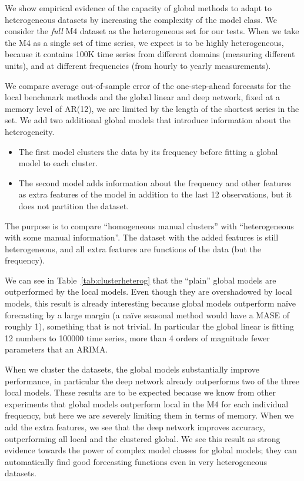 \documentclass[a4paper]{article}
\theoremstyle{custom}
\begin{document}
 We show empirical evidence of the capacity of global methods to adapt to heterogeneous datasets by increasing the complexity of the model class. We consider the \textit{full} M4 dataset as the heterogeneous set for our tests.
 When we take the M4 as a single set of time series, we expect is to be highly heterogeneous, because it contains 100K time series from different domains (measuring different units), and at different frequencies (from hourly to yearly measurements).

We compare average out-of-sample error of the one-step-ahead forecasts for the local benchmark methods and the global linear and deep network, fixed at a memory level of AR(12), we are limited by the length of the shortest series in the set.
We add two additional global models that introduce information about the heterogeneity.
\begin{itemize}
\item The first model clusters the data by its frequency before fitting a global model to each cluster.
\item The second model adds information about the frequency and other features \cite{hyndman2019tsfeatures} as extra features of the model in addition to the last 12 observations, but it does not partition the dataset.
\end{itemize}

The purpose is to compare ``homogeneous manual clusters'' with ``heterogeneous with some manual information''. The dataset with the added features is still heterogeneous, and all extra features are functions of the data (but the frequency).

We can see in Table~\ref{tab:clusterheterog} that the ``plain'' global models are outperformed by the local models. Even though they are overshadowed by local models, this result is already interesting because global models outperform naïve forecasting by a large margin (a naïve seasonal method would have a MASE of roughly 1), something that is not trivial. In particular the global linear is fitting 12 numbers to 100000 time series, more than 4 orders of magnitude fewer parameters that an ARIMA.

When we cluster the datasets, the global models substantially improve performance, in particular the deep network already outperforms two of the three local models. These results are to be expected because we know from other experiments that global models outperform local in the M4 for each individual frequency, but here we are severely limiting them in terms of memory.
When we add the extra features, we see that the deep network improves accuracy, outperforming all local and the clustered global. We see this result as strong evidence towards the power of complex model classes for global models; they can automatically find good forecasting functions even in very heterogeneous datasets.
\end{document}
